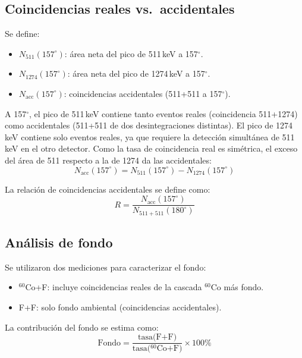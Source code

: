\documentclass[12pt,a4paper]{article}
\begin{document}
\subsection{Coincidencias reales vs.\ accidentales}

Se define:
\begin{itemize}
  \item $N_{511}(157^\circ)$: \'area neta del pico de 511\,keV a 157$^\circ$.
  \item $N_{1274}(157^\circ)$: \'area neta del pico de 1274\,keV a 157$^\circ$.
  \item $N_{\text{acc}}(157^\circ)$: coincidencias accidentales (511+511 a 157$^\circ$).
\end{itemize}
A 157$^\circ$, el pico de 511\,keV contiene tanto eventos reales (coincidencia 511+1274)
como accidentales (511+511 de dos desintegraciones distintas). El pico de 1274\,keV
contiene solo eventos reales, ya que requiere la detecci\'on simult\'anea de 511\,keV
en el otro detector. Como la tasa de coincidencia real es sim\'etrica, el exceso
del \'area de 511 respecto a la de 1274 da las accidentales:
\begin{equation}
N_{\text{acc}}(157^\circ) = N_{511}(157^\circ) - N_{1274}(157^\circ)
\end{equation}

La relaci\'on de coincidencias accidentales se define como:
\begin{equation}
R = \frac{N_{\text{acc}}(157^\circ)}{N_{511+511}(180^\circ)}
\end{equation}

\subsection{An\'alisis de fondo}

Se utilizaron dos mediciones para caracterizar el fondo:
\begin{itemize}
  \item $^{60}$Co+F: incluye coincidencias reales de la cascada $^{60}$Co m\'as fondo.
  \item F+F: solo fondo ambiental (coincidencias accidentales).
\end{itemize}
La contribuci\'on del fondo se estima como:
\begin{equation}
\text{Fondo} = \frac{\text{tasa(F+F)}}{\text{tasa($^{60}$Co+F)}} \times 100\%
\end{equation}

\end{document}
